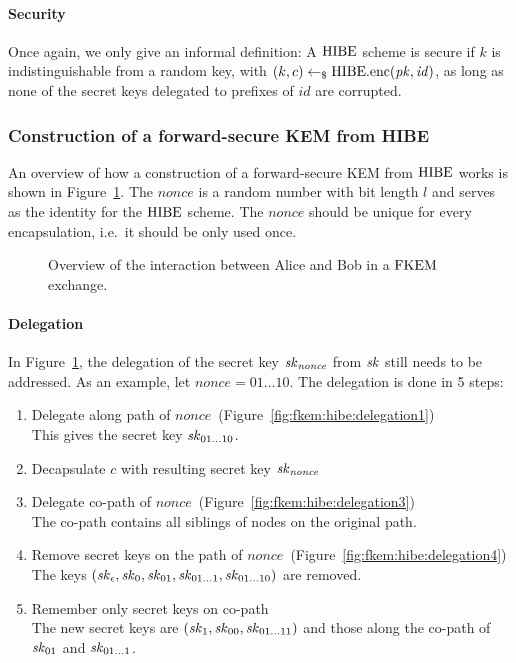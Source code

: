 \paragraph{Security} Once again, we only give an informal definition:
A $\mathrm{HIBE}$ scheme is secure if $k$ is indistinguishable from a random key, with $(k,c)\gets_\$\mathrm{HIBE}.\mathrm{enc}(\mathit{pk},\mathit{id})$, as long as none of the secret keys delegated to prefixes of $\mathit{id}$ are corrupted.

\subsubsection{Construction of a forward-secure KEM from HIBE}

An overview of how a construction of a forward-secure KEM from $\mathrm{HIBE}$ works is shown in Figure~\ref{fig:fkem:hibe:interaction}.
The $\mathit{nonce}$ is a random number with bit length $l$ and serves as the identity for the $\mathrm{HIBE}$ scheme. 
The $\mathit{nonce}$ should be unique for every encapsulation, i.e.\ it should be only used once.

\begin{figure}[!ht]
    \centering
    
    \caption{Overview of the interaction between Alice and Bob in a $\mathrm{FKEM}$ exchange.}
    \label{fig:fkem:hibe:interaction}
\end{figure}

\paragraph{Delegation} In Figure~\ref{fig:fkem:hibe:interaction}, the delegation of the secret key $\mathit{sk}_{\mathit{nonce}}$ from $\mathit{sk}$ still needs to be addressed.
As an example, let $\mathit{nonce}=01\dots10$. The delegation is done in 5 steps:
\begin{enumerate}
    \item Delegate along path of $\mathit{nonce}$~(Figure~\ref{fig:fkem:hibe:delegation1})\\
        This gives the secret key $\mathit{sk}_{01\dots10}$.
    \item Decapsulate $c$ with resulting secret key $\mathit{sk}_{\mathit{nonce}}$
    \item Delegate co-path of $\mathit{nonce}$~(Figure~\ref{fig:fkem:hibe:delegation3})\\
        The co-path contains all siblings of nodes on the original path.
    \item Remove secret keys on the path of $\mathit{nonce}$~(Figure~\ref{fig:fkem:hibe:delegation4})\\
        The keys $(\mathit{sk}_\epsilon,\mathit{sk}_0,\mathit{sk}_{01},\mathit{sk}_{01\dots1},\mathit{sk}_{01\dots10})$ are removed.
    \item Remember only secret keys on co-path\\
        The new secret keys are $(\mathit{sk}_1,\mathit{sk}_{00},\mathit{sk}_{01\dots11})$ and those along the co-path of $\mathit{sk}_{01}$ and $\mathit{sk}_{01\dots1}$.
\end{enumerate}


